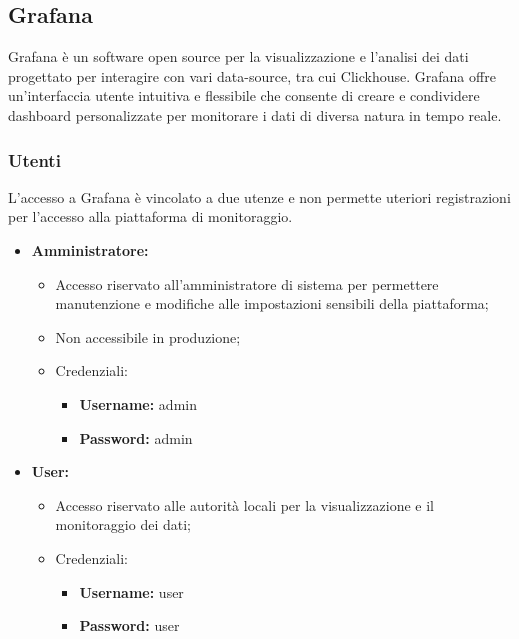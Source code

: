 \subsection{Grafana}
Grafana è un software open source per la visualizzazione e l'analisi dei dati progettato per interagire con vari data-source, tra cui Clickhouse. Grafana offre un'interfaccia utente intuitiva e flessibile che consente di creare e condividere dashboard personalizzate per monitorare i dati di diversa natura in tempo reale.

\subsubsection{Utenti}
L'accesso a Grafana è vincolato a due utenze e non permette uteriori registrazioni per l'accesso alla piattaforma di monitoraggio.
\begin{itemize}
    \item \textbf{Amministratore:} 
    \begin{itemize}
        \item Accesso riservato all'amministratore di sistema per permettere manutenzione e modifiche alle impostazioni sensibili della piattaforma;
        \item Non accessibile in produzione;
        \item Credenziali:
        \begin{itemize}
            \item \textbf{Username:} admin
            \item \textbf{Password:} admin
        \end{itemize} 
    \end{itemize}
    
    \item \textbf{User:} 
    \begin{itemize}
        \item Accesso riservato alle autorità locali per la visualizzazione e il monitoraggio dei dati;
        \item Credenziali:
        \begin{itemize}
            \item \textbf{Username:} user
            \item \textbf{Password:} user
        \end{itemize} 
    \end{itemize}
\end{itemize}

